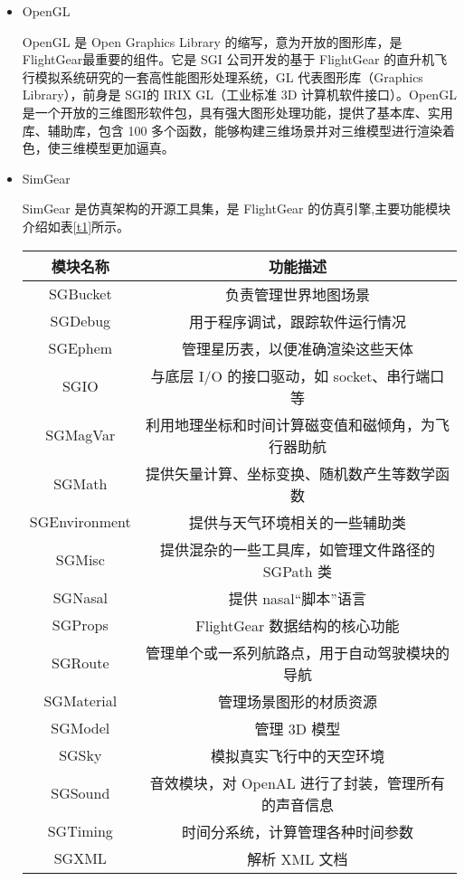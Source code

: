 \begin{itemize}
  \item OpenGL

  OpenGL 是 Open Graphics Library 的缩写，意为开放的图形库，是 FlightGear最重要的组件。它是 SGI 公司开发的基于 FlightGear 的直升机飞行模拟系统研究的一套高性能图形处理系统，GL 代表图形库（Graphics  Library），前身是 SGI的 IRIX GL（工业标准 3D 计算机软件接口）。OpenGL 是一个开放的三维图形软件包，具有强大图形处理功能，提供了基本库、实用库、辅助库，包含 100 多个函数，能够构建三维场景并对三维模型进行渲染着色，使三维模型更加逼真。
  \item SimGear

SimGear 是仿真架构的开源工具集，是 FlightGear 的仿真引擎,主要功能模块介绍如表\ref{t1}所示。
\vspace{-10pt}
\begin{table}[!h]
\begin{center}
\caption{SimGear功能模块介绍}\label{t1}
\begin{longtable}{ | c| c|}
\hline
模块名称                                    & 功能描述                                                                   \\\hline
SGBucket                     & 负责管理世界地图场景                                     \\\hline
SGDebug           & 用于程序调试，跟踪软件运行情况                                        \\\hline
SGEphem                   & 管理星历表，以便准确渲染这些天体                                                 \\\hline
SGIO                      & 与底层 I/O 的接口驱动，如 socket、串行端口等
                                          \\\hline
SGMagVar                 & 利用地理坐标和时间计算磁变值和磁倾角，为飞行器助航
                          \\\hline
SGMath  &  提供矢量计算、坐标变换、随机数产生等数学函数
 \\\hline
SGEnvironment             & 提供与天气环境相关的一些辅助类
\\\hline
SGMisc  &提供混杂的一些工具库，如管理文件路径的 SGPath 类
\\\hline
SGNasal &提供 nasal“脚本”语言
\\\hline
SGProps &FlightGear 数据结构的核心功能
\\\hline
SGRoute &管理单个或一系列航路点，用于自动驾驶模块的导航
\\\hline
SGMaterial&管理场景图形的材质资源
\\\hline
SGModel &管理 3D 模型
\\\hline
SGSky &模拟真实飞行中的天空环境
\\\hline
SGSound &音效模块，对 OpenAL 进行了封装，管理所有的声音信息
\\\hline
SGTiming &时间分系统，计算管理各种时间参数
\\\hline
SGXML &解析 XML 文档
\\\hline
\end{longtable}
\end{center}
\end{table}
\vspace{-10pt}


\end{itemize}
